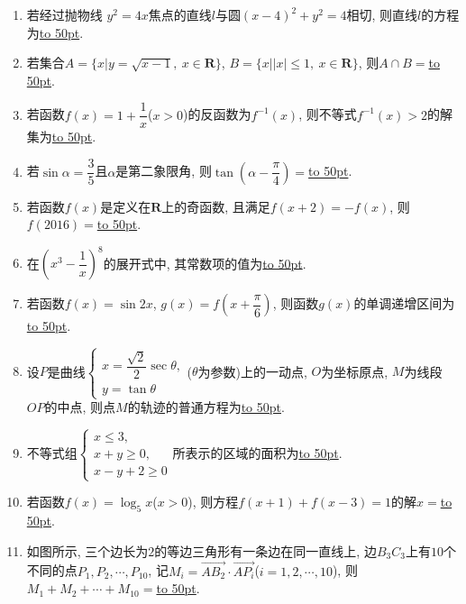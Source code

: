 \documentclass[10pt,a4paper]{article}
\newcommand{\blank}[1]{\underline{\hbox to #1pt{}}}
\begin{document}
\begin{enumerate}[1.]
\begin{center}
\end{center}
\item 若经过抛物线 $y^2=4x$焦点的直线$l$与圆$(x-4)^2+y^2=4$相切, 则直线$l$的方程为\blank{50}.



\item 若集合$A=\{x|y=\sqrt{x-1},\ x\in \mathbf{R}\}$, $B=\{x||x|\le 1,\ x\in \mathbf{R}\}$, 则$A\cap B=$\blank{50}.
\item 若函数$f(x)=1+\dfrac1x$($x>0$)的反函数为$f^{-1}(x)$, 则不等式$f^{-1}(x)>2$的解集为\blank{50}.
\item 若$\sin \alpha =\dfrac35$且$\alpha$是第二象限角, 则$\tan(\alpha -\dfrac\pi 4)=$\blank{50}.
\item 若函数$f(x)$是定义在$\mathbf{R}$上的奇函数, 且满足$f(x+2)=-f(x)$, 则$f(2016)=$\blank{50}.
\item 在$(x^3-\dfrac1x)^8$的展开式中, 其常数项的值为\blank{50}.
\item 若函数$f(x)=\sin 2x$, $g(x)=f(x+\dfrac\pi 6)$, 则函数$g(x)$的单调递增区间为\blank{50}.
\item 设$P$是曲线$\begin{cases} x=\dfrac{\sqrt2}2\sec \theta, \\ y=\tan \theta \end{cases}$($\theta $为参数)上的一动点, $O$为坐标原点, $M$为线段$OP$的中点, 则点$M$的轨迹的普通方程为\blank{50}.
\item 不等式组$\begin{cases} x\le 3, \\ x+y\ge 0, \\ x-y+2 \ge 0 \end{cases}$所表示的区域的面积为\blank{50}.
\item 若函数$f(x)=\log _5 x$($x>0$), 则方程$f(x+1)+f(x-3)=1$的解$x=$\blank{50}.
\item 如图所示, 三个边长为$2$的等边三角形有一条边在同一直线上, 边$B_3C_3$上有$10$个不同的点$P_1,P_2,\cdots,P_{10}$, 记$M_i=\overrightarrow{AB_2}\cdot \overrightarrow{AP_i}$($i=1,2,\cdots,10$), 则$M_1+M_2+\cdots+M_{10}=$\blank{50}.

\end{enumerate}
\end{document}
